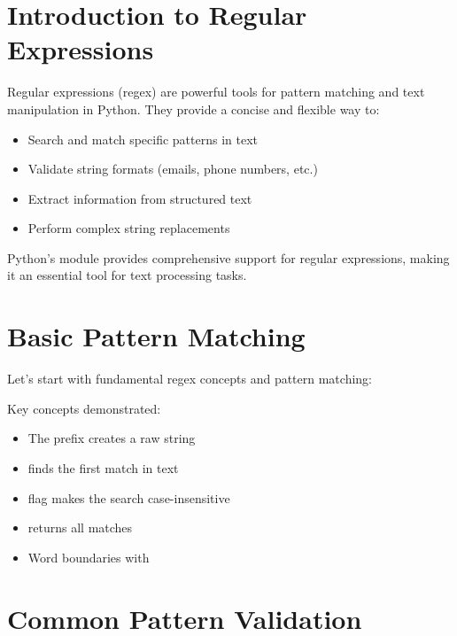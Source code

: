\section{Introduction to Regular Expressions}

Regular expressions (regex) are powerful tools for pattern matching and text manipulation in Python. They provide a concise and flexible way to:

\begin{itemize}
    \item Search and match specific patterns in text
    \item Validate string formats (emails, phone numbers, etc.)
    \item Extract information from structured text
    \item Perform complex string replacements
\end{itemize}

Python's  module provides comprehensive support for regular expressions, making it an essential tool for text processing tasks.

\section{Basic Pattern Matching}

Let's start with fundamental regex concepts and pattern matching:

\begin{macterminal}

\end{macterminal}

Key concepts demonstrated:
\begin{itemize}
    \item The  prefix creates a raw string
    \item {} finds the first match in text
    \item {} flag makes the search case-insensitive
    \item {} returns all matches
    \item Word boundaries with 
\end{itemize}

\section{Common Pattern Validation}

